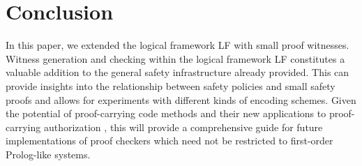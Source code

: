 \documentclass{llncs}
\begin{document}
\section{Conclusion}
In this paper, we extended the logical framework LF with small proof
witnesses. Witness generation and checking within the logical
framework LF constitutes a valuable addition to the general safety
infrastructure already provided. This can provide insights into the
relationship between safety policies and small safety proofs and
allows for experiments with different kinds of encoding schemes.
Given the potential of proof-carrying code methods and their new
applications to proof-carrying authorization
\cite{AppelFelten99,bauer:thesis}, this will provide a comprehensive
guide for future implementations of proof checkers which need not be
restricted to first-order Prolog-like systems.





\end{document}
